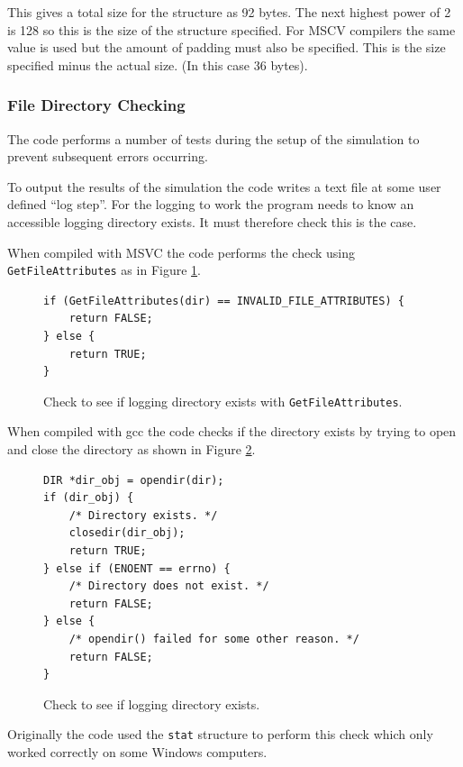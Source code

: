 \documentclass[../Interim_Report_Master]{subfiles}
\begin{document}
This gives a total size for the structure as 92 bytes. The next highest power of 2 is 128 so this is the size of the structure specified. For MSCV compilers the same value is used but the amount of padding must also be specified. This is the size specified minus the actual size. (In this case 36 bytes). 

\subsubsection{File Directory Checking}
The code performs a number of tests during the setup of the simulation to prevent subsequent errors occurring. 

To output the results of the simulation the code writes a text file at some user defined ``log step''. For the logging to work the program needs to know an accessible logging directory exists. It must therefore check this is the case. 

When compiled with MSVC the code performs the check using \lstinline[style=cstyleintext]|GetFileAttributes| as in Figure \ref{code:dir_check_msvc}.
\begin{figure}[h]
\begin{lstlisting}[frame=single, style=cstyle]
if (GetFileAttributes(dir) == INVALID_FILE_ATTRIBUTES) {
	return FALSE;
} else {
	return TRUE;
}
\end{lstlisting}
\caption{Check to see if logging directory exists with \lstinline[style=cstyleintext]|GetFileAttributes|.}
\label{code:dir_check_msvc}
\end{figure}

When compiled with gcc the code checks if the directory exists by trying to open and close the directory as shown in Figure \ref{code:dir_check_gcc}.
\begin{figure}[h]
\begin{lstlisting}[frame=single, style=cstyle]
DIR *dir_obj = opendir(dir);
if (dir_obj) {
	/* Directory exists. */
	closedir(dir_obj);
	return TRUE;
} else if (ENOENT == errno) {
	/* Directory does not exist. */
	return FALSE;
} else {
	/* opendir() failed for some other reason. */
	return FALSE;
}
\end{lstlisting}
\caption{Check to see if logging directory exists.}
\label{code:dir_check_gcc}
\end{figure}

Originally the code used the \lstinline[style=cstyleintext]|stat| structure to perform this check which only worked correctly on some Windows computers.
\end{document}
